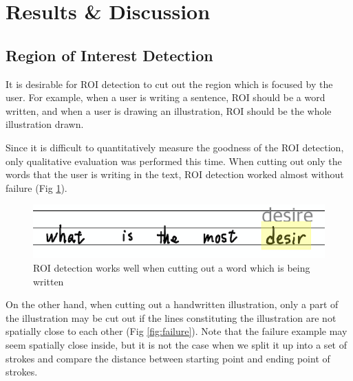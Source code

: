 \section{Results \& Discussion}
\label{section:result-discussion}

\subsection{Region of Interest Detection}

It is desirable for ROI detection to cut out the region which is focused by
the user. For example, when a user is writing a sentence, ROI should be a word
written, and when a user is drawing an illustration, ROI should be the whole
illustration drawn.

Since it is difficult to quantitatively measure the goodness of the ROI detection,
only qualitative evaluation was performed this time.
When cutting out only the words that the user is writing in the text,
ROI detection worked almost without failure (Fig \ref{fig:cutting-word-region}).

\begin{figure}
    \centering
    \includegraphics[scale=0.6]{images/word_region.png}
    \caption{ROI detection works well when cutting out a word which is being written}
    \label{fig:cutting-word-region}
\end{figure}

On the other hand, when cutting out a handwritten illustration,
only a part of the illustration may be cut out if the lines constituting
the illustration are not spatially close to each other (Fig \ref{fig:failure}).
Note that the failure example may seem spatially close inside, but it is not the
case when we split it up into a set of strokes and compare the distance between
starting point and ending point of strokes.

